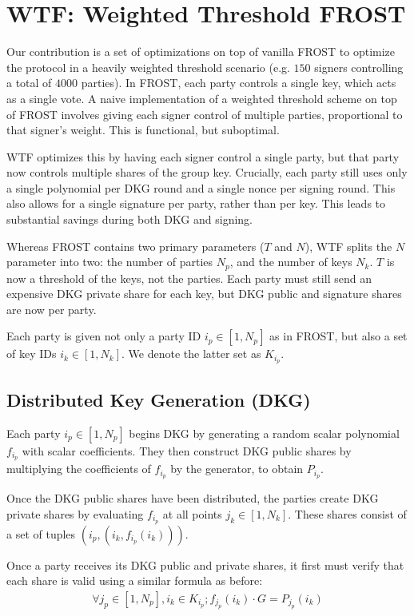 \documentclass{article}
\begin{document}
\section{
  WTF: Weighted Threshold FROST
}

Our contribution is a set of optimizations on top of vanilla FROST to optimize the protocol in a heavily weighted threshold scenario (e.g. $150$ signers controlling a total of $4000$ parties). In FROST, each party controls a single key, which acts as a single vote.  A naive implementation of a weighted threshold scheme on top of FROST involves giving each signer control of multiple parties, proportional to that signer's weight.  This is functional, but suboptimal.

WTF optimizes this by having each signer control a single party, but that party now controls multiple shares of the group key.  Crucially, each party still uses only a single polynomial per DKG round and a single nonce per signing round.  This also allows for a single signature per party, rather than per key.  This leads to substantial savings during both DKG and signing.

Whereas FROST contains two primary parameters ($T$ and $N$), WTF splits the $N$ parameter into two: the number of parties $N_p$, and the number of keys $N_k$.  $T$ is now a threshold of the keys, not the parties.  Each party must still send an expensive DKG private share for each key, but DKG public and signature shares are now per party.  

Each party is given not only a party ID $i_p \in [1, N_p]$ as in FROST, but also a set of key IDs $i_k \in [1, N_k]$.  We denote the latter set as $K_{i_p}$.

\subsection{
  Distributed Key Generation (DKG)
}

Each party $i_p \in [1, N_p]$ begins DKG by generating a random scalar polynomial $f_{i_p}$ with scalar coefficients.  They then construct DKG public shares by multiplying the coefficients of $f_{i_p}$ by the generator, to obtain $P_{i_p}$.

Once the DKG public shares have been distributed, the parties create DKG private shares by evaluating $f_{i_p}$ at all points $j_k \in [1, N_k]$.  These shares consist of a set of tuples $(i_p, (i_k, f_{i_p}(i_k)))$.

Once a party receives its DKG public and private shares, it first must verify that each share is valid using a similar formula as before:
\begin{align}
  \forall j_p \in [1,N_p], i_k \in K_{i_p}; f_{j_p}(i_k) \cdot G = P_{j_p}(i_k)
\end{align}
\end{document}
